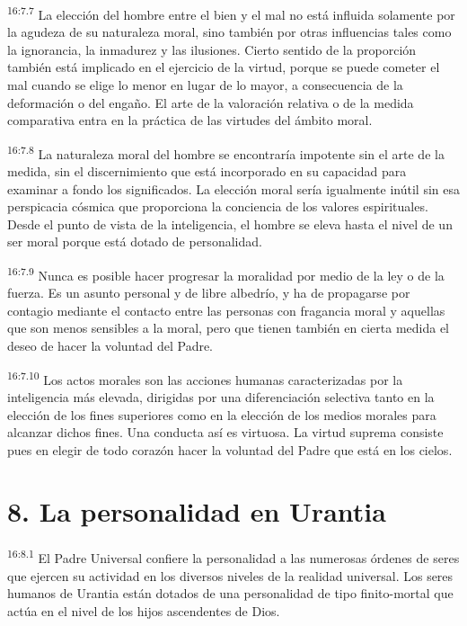 \par
\textsuperscript{16:7.7} La elección del hombre entre el bien y el mal no está influida solamente por la agudeza de su naturaleza moral, sino también por otras influencias tales como la ignorancia, la inmadurez y las ilusiones. Cierto sentido de la proporción también está implicado en el ejercicio de la virtud, porque se puede cometer el mal cuando se elige lo menor en lugar de lo mayor, a consecuencia de la deformación o del engaño. El arte de la valoración relativa o de la medida comparativa entra en la práctica de las virtudes del ámbito moral.

\par
\textsuperscript{16:7.8} La naturaleza moral del hombre se encontraría impotente sin el arte de la medida, sin el discernimiento que está incorporado en su capacidad para examinar a fondo los significados. La elección moral sería igualmente inútil sin esa perspicacia cósmica que proporciona la conciencia de los valores espirituales. Desde el punto de vista de la inteligencia, el hombre se eleva hasta el nivel de un ser moral porque está dotado de personalidad.

\par
\textsuperscript{16:7.9} Nunca es posible hacer progresar la moralidad por medio de la ley o de la fuerza. Es un asunto personal y de libre albedrío, y ha de propagarse por contagio mediante el contacto entre las personas con fragancia moral y aquellas que son menos sensibles a la moral, pero que tienen también en cierta medida el deseo de hacer la voluntad del Padre.

\par
\textsuperscript{16:7.10} Los actos morales son las acciones humanas caracterizadas por la inteligencia más elevada, dirigidas por una diferenciación selectiva tanto en la elección de los fines superiores como en la elección de los medios morales para alcanzar dichos fines. Una conducta así es virtuosa. La virtud suprema consiste pues en elegir de todo corazón hacer la voluntad del Padre que está en los cielos.

\section*{8. La personalidad en Urantia}
\par
\textsuperscript{16:8.1} El Padre Universal confiere la personalidad a las numerosas órdenes de seres que ejercen su actividad en los diversos niveles de la realidad universal. Los seres humanos de Urantia están dotados de una personalidad de tipo finito-mortal que actúa en el nivel de los hijos ascendentes de Dios.

